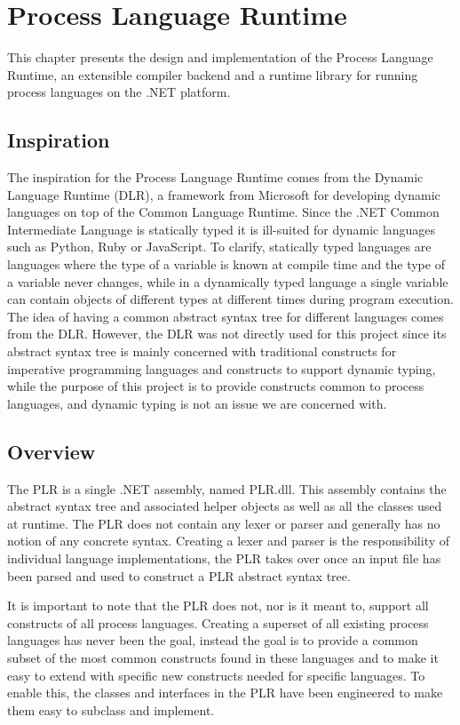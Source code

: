 \chapter{Process Language Runtime}

	This chapter presents the design and implementation of the Process Language 
	Runtime, an extensible compiler backend and a runtime library for running 	
	process languages on the .NET platform. 

\section{Inspiration}

	The inspiration for the Process Language Runtime comes from the Dynamic 
	Language Runtime  (DLR), a framework from Microsoft for 	
	developing dynamic languages on top of the Common Language Runtime. Since 
	the .NET Common Intermediate Language is statically typed it is ill-suited
	for dynamic languages such as Python, Ruby or JavaScript. To clarify, 
	statically typed languages are languages where the type of a variable is 
	known at compile time and the type of a variable never changes, while in a 
	dynamically typed language a single variable can contain objects of 	
	different types at different times during program execution. The idea of 
	having a common abstract syntax tree for different languages comes from the 
	DLR. However, the DLR was not directly used for this project since its 
	abstract syntax tree is mainly concerned with traditional constructs for 
	imperative programming languages and constructs to support dynamic typing, 
	while the purpose of this project is to provide constructs common to process 
	languages, and dynamic typing is not an issue we are concerned with.

\section{Overview}

	The PLR is a single .NET assembly, named PLR.dll. This assembly contains the 
	abstract syntax tree and associated helper objects as well as all the 
	classes used at runtime. The PLR does not contain any lexer or parser and 
	generally has no notion of any concrete syntax. Creating a lexer and parser 
	is the responsibility of individual language implementations, the PLR takes 
	over once an input file has been parsed and used to construct a PLR abstract 
	syntax tree. 
	
	It is important to note that the PLR does not, nor is it meant 
	to, support all constructs of all process languages. Creating a superset of 
	all existing process languages has never been the goal, instead the goal is 
	to provide a common subset of the most common constructs found in these 
	languages and to make it easy to extend with specific new constructs needed 
	for specific languages. To enable this, the classes and interfaces in the 
	PLR have been engineered to make them easy to subclass and implement.
	
